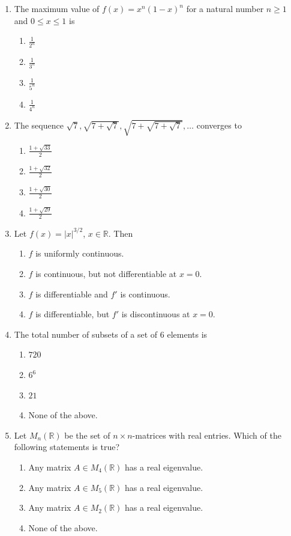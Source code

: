 \documentclass[11pt, a4paper]{article}
\begin{document}
\begin{enumerate}
  \item The maximum value of $f(x) = x^n(1 - x)^n$ for a natural number $n \ge 1$ and $0 \le x \le 1$ is
  \begin{enumerate}[label=(\alph*)]
    \item $\frac{1}{2^n}$
    \item $\frac{1}{3^n}$
    \item $\frac{1}{5^n}$
    \item $\frac{1}{4^n}$
  \end{enumerate}

  \item The sequence $\sqrt{7}, \sqrt{7 + \sqrt{7}}, \sqrt{7 + \sqrt{7 + \sqrt{7}}}, \dots$ converges to
  \begin{enumerate}[label=(\alph*)]
    \item $\frac{1 + \sqrt{33}}{2}$
    \item $\frac{1 + \sqrt{32}}{2}$
    \item $\frac{1 + \sqrt{30}}{2}$
    \item $\frac{1 + \sqrt{29}}{2}$
  \end{enumerate}

  \item Let $f(x) = |x|^{3/2}$, $x \in \mathbb{R}$. Then
  \begin{enumerate}[label=(\alph*)]
    \item $f$ is uniformly continuous.
    \item $f$ is continuous, but not differentiable at $x = 0$.
    \item $f$ is differentiable and $f'$ is continuous.
    \item $f$ is differentiable, but $f'$ is discontinuous at $x = 0$.
  \end{enumerate}

  \item The total number of subsets of a set of $6$ elements is
  \begin{enumerate}[label=(\alph*)]
    \item $720$
    \item $6^6$
    \item $21$
    \item None of the above.
  \end{enumerate}

  \item Let $M_n(\mathbb{R})$ be the set of $n \times n$-matrices with real entries. Which of the following statements is true?
  \begin{enumerate}[label=(\alph*)]
    \item Any matrix $A \in M_4(\mathbb{R})$ has a real eigenvalue.
    \item Any matrix $A \in M_5(\mathbb{R})$ has a real eigenvalue.
    \item Any matrix $A \in M_2(\mathbb{R})$ has a real eigenvalue.
    \item None of the above.
  \end{enumerate}


\end{enumerate}
\end{document}
